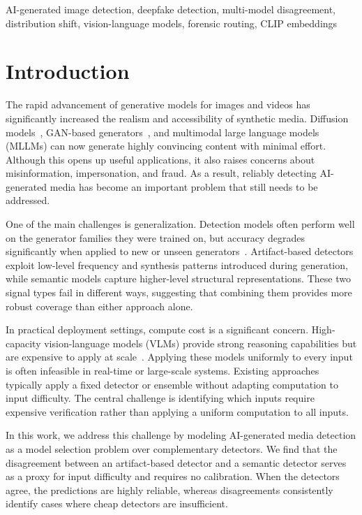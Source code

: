 \documentclass{ieeeaccess}
\begin{document}
\begin{keywords}
AI-generated image detection, deepfake 
detection, multi-model disagreement, distribution shift, 
vision-language models, forensic routing, CLIP embeddings
\end{keywords}

\titlepgskip=-21pt
\maketitle

\section{Introduction}

The rapid advancement of generative models for images and videos has significantly increased the realism and accessibility of synthetic media. Diffusion models~\cite{Wang_2023_ICCV}, GAN-based generators~\cite{wang2020cnn}, and multimodal large language models (MLLMs) can now generate highly convincing content with minimal effort. Although this opens up useful applications, it also raises concerns about misinformation, impersonation, and fraud. As a result, reliably detecting AI-generated media has become an important problem that still needs to be addressed.

One of the main challenges is generalization. Detection models often perform well on the generator families they were trained on, but accuracy degrades significantly when applied to new or unseen generators~\cite{NEURIPS2023_f4d4a021}. Artifact-based detectors exploit low-level frequency and synthesis patterns introduced during generation, while semantic models capture higher-level structural representations. These two signal types fail in different ways, suggesting that combining them provides more robust coverage than either approach alone.


In practical deployment settings, compute cost is a significant concern. High-capacity
vision-language models (VLMs) provide strong reasoning capabilities but are expensive to apply at scale~\cite{chen2024frugalgpt}. Applying these models uniformly to every input is often infeasible in real-time or large-scale systems. Existing approaches typically apply a
fixed detector or ensemble without adapting computation to input difficulty. The central challenge is identifying which inputs require expensive verification rather than applying a
uniform computation to all inputs.


In this work, we address this challenge by modeling AI-generated media detection as a model selection problem over complementary detectors. We find that the disagreement between an artifact-based detector and a semantic detector serves as a proxy for input difficulty and requires no calibration. When the detectors agree, the predictions are highly reliable, whereas disagreements consistently identify cases where cheap detectors are insufficient.
\end{document}
